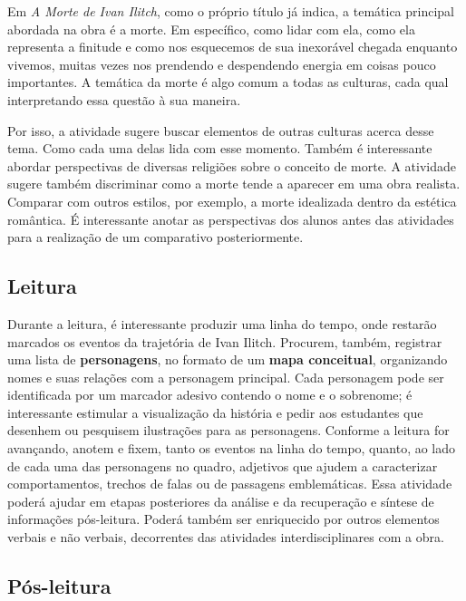 \documentclass{extarticle}
\begin{document}
Em \emph{A Morte de Ivan Ilitch}, como o próprio título já
indica, a temática principal abordada na obra é a morte. Em específico,
como lidar com ela, como ela representa a finitude e como nos esquecemos
de sua inexorável chegada enquanto vivemos, muitas vezes nos prendendo e
despendendo energia em coisas pouco importantes. A temática da morte é
algo comum a todas as culturas, cada qual interpretando essa questão à
sua maneira.

Por isso, a atividade sugere buscar elementos de outras culturas acerca
desse tema. Como cada uma delas lida com esse momento. Também é
interessante abordar perspectivas de diversas religiões sobre o conceito
de morte. A atividade sugere também discriminar como a morte tende a
aparecer em uma obra realista. Comparar com outros estilos, por exemplo,
a morte idealizada dentro da estética romântica. É interessante anotar
as perspectivas dos alunos antes das atividades para a realização de um
comparativo posteriormente.

\subsection{Leitura}


Durante a leitura, é interessante produzir uma linha do
tempo, onde restarão marcados os eventos da trajetória de Ivan Ilitch.
Procurem, também, registrar uma lista de \textbf{personagens}, no
formato de um \textbf{mapa conceitual}, organizando nomes e suas
relações com a personagem principal. Cada personagem pode ser
identificada por um marcador adesivo contendo o nome e o sobrenome; é
interessante estimular a visualização da história e pedir aos estudantes
que desenhem ou pesquisem ilustrações para as personagens. Conforme a
leitura for avançando, anotem e fixem, tanto os eventos na linha do
tempo, quanto, ao lado de cada uma das personagens no quadro, adjetivos
que ajudem a caracterizar comportamentos, trechos de falas ou de
passagens emblemáticas. Essa atividade poderá ajudar em etapas
posteriores da análise e da recuperação e síntese de informações
pós-leitura. Poderá também ser enriquecido por outros elementos verbais
e não verbais, decorrentes das atividades interdisciplinares com a obra.

\subsection{Pós-leitura}
\end{document}
